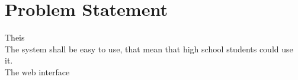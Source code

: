 \section{Problem Statement}Theis\\
The system shall be easy to use, that mean that high school students could use it.\\
The web interface 